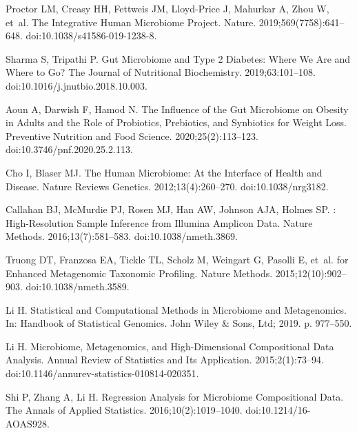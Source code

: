 \documentclass[10pt,letterpaper]{article}
\begin{document}

\begin{thebibliography}{10}

Proctor LM, Creasy HH, Fettweis JM, {Lloyd-Price} J, Mahurkar A, Zhou W, et~al.
\newblock The {{Integrative Human Microbiome Project}}.
\newblock Nature. 2019;569(7758):641--648.
\newblock doi:{10.1038/s41586-019-1238-8}.

Sharma S, Tripathi P.
\newblock Gut Microbiome and Type 2 Diabetes: Where We Are and Where to Go?
\newblock The Journal of Nutritional Biochemistry. 2019;63:101--108.
\newblock doi:{10.1016/j.jnutbio.2018.10.003}.

Aoun A, Darwish F, Hamod N.
\newblock The {{Influence}} of the {{Gut Microbiome}} on {{Obesity}} in
  {{Adults}} and the {{Role}} of {{Probiotics}}, {{Prebiotics}}, and
  {{Synbiotics}} for {{Weight Loss}}.
\newblock Preventive Nutrition and Food Science. 2020;25(2):113--123.
\newblock doi:{10.3746/pnf.2020.25.2.113}.

Cho I, Blaser MJ.
\newblock The Human Microbiome: At the Interface of Health and Disease.
\newblock Nature Reviews Genetics. 2012;13(4):260--270.
\newblock doi:{10.1038/nrg3182}.

Callahan BJ, McMurdie PJ, Rosen MJ, Han AW, Johnson AJA, Holmes SP.
: {{High}}-Resolution Sample Inference from {{Illumina}}
  Amplicon Data.
\newblock Nature Methods. 2016;13(7):581--583.
\newblock doi:{10.1038/nmeth.3869}.

Truong DT, Franzosa EA, Tickle TL, Scholz M, Weingart G, Pasolli E, et~al.
 for Enhanced Metagenomic Taxonomic Profiling.
\newblock Nature Methods. 2015;12(10):902--903.
\newblock doi:{10.1038/nmeth.3589}.

Li H.
\newblock Statistical and {{Computational Methods}} in {{Microbiome}} and
  {{Metagenomics}}.
\newblock In: Handbook of {{Statistical Genomics}}. {John Wiley \& Sons, Ltd};
  2019. p. 977--550.

Li H.
\newblock Microbiome, {{Metagenomics}}, and {{High}}-{{Dimensional
  Compositional Data Analysis}}.
\newblock Annual Review of Statistics and Its Application. 2015;2(1):73--94.
\newblock doi:{10.1146/annurev-statistics-010814-020351}.

Shi P, Zhang A, Li H.
\newblock Regression Analysis for Microbiome Compositional Data.
\newblock The Annals of Applied Statistics. 2016;10(2):1019--1040.
\newblock doi:{10.1214/16-AOAS928}.


\end{thebibliography}
\end{document}
